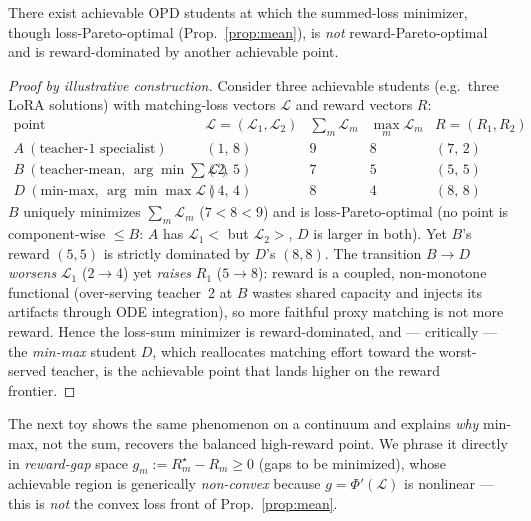 \begin{proposition}
\label{prop:reward-dom}
There exist achievable OPD students at which the summed-loss minimizer, though
loss-Pareto-optimal (Prop.~\ref{prop:mean}), is \emph{not} reward-Pareto-optimal and is
reward-dominated by another achievable point.
\end{proposition}

\begin{proof}[Proof by illustrative construction]
Consider three achievable students (e.g.\ three LoRA solutions) with matching-loss
vectors $\mathcal L$ and reward vectors $R$:
\[
\begin{array}{c|c|c|c|c}
\text{point} & \mathcal L=(\mathcal L_1,\mathcal L_2) & \textstyle\sum_m\mathcal L_m
 & \max_m \mathcal L_m & R=(R_1,R_2)\\\hline
A\ (\text{teacher-1 specialist}) & (1,\,8) & 9 & 8 & (7,\,2)\\
B\ (\text{teacher-mean, }\arg\min\textstyle\sum\mathcal L) & (2,\,5) & 7 & 5 & (5,\,5)\\
D\ (\text{min-max, }\arg\min\max\mathcal L) & (4,\,4) & 8 & 4 & (8,\,8)
\end{array}
\]
$B$ uniquely minimizes $\sum_m\mathcal L_m$ ($7<8<9$) and is loss-Pareto-optimal (no
point is component-wise $\le B$: $A$ has $\mathcal L_1{<}$ but $\mathcal L_2{>}$, $D$ is
larger in both). Yet $B$'s reward $(5,5)$ is strictly dominated by $D$'s $(8,8)$. The
transition $B\to D$ \emph{worsens} $\mathcal L_1$ ($2\to4$) yet \emph{raises} $R_1$
($5\to8$): reward is a coupled, non-monotone functional (over-serving teacher~2 at $B$
wastes shared capacity and injects its artifacts through ODE integration), so more
faithful proxy matching is not more reward. Hence the loss-sum minimizer is
reward-dominated, and --- critically --- the \emph{min-max} student $D$, which
reallocates matching effort toward the worst-served teacher, is the achievable point
that lands higher on the reward frontier.
\end{proof}

The next toy shows the same phenomenon on a continuum and explains \emph{why} min-max,
not the sum, recovers the balanced high-reward point. We phrase it directly in
\emph{reward-gap} space $g_m := R_m^\star - R_m \ge 0$ (gaps to be minimized), whose
achievable region is generically \emph{non-convex} because $g=\Phi'(\mathcal L)$ is
nonlinear --- this is \emph{not} the convex loss front of Prop.~\ref{prop:mean}.

